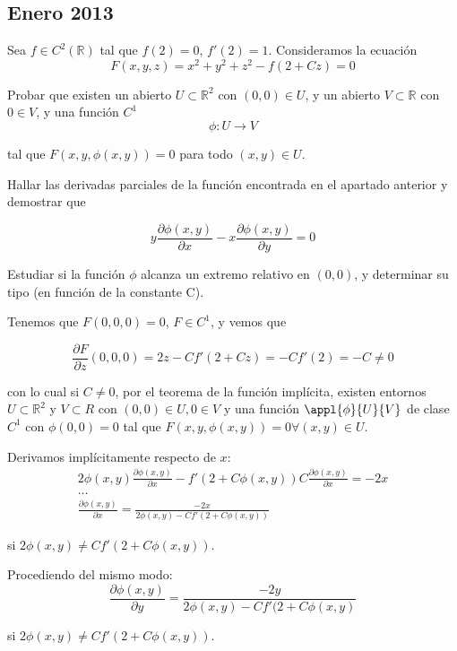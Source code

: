 \subsection{Enero 2013}
\begin{problem}[1]

Sea $f\in C^2(\mathbb{R})$ tal que $f(2) = 0$, $f'(2)=1$. Consideramos la ecuación \[ F(x,y,z) = x^2+y^2+z^2-f(2+Cz)=0 \]

\ppart Probar que existen un abierto $U\subset \mathbb{R}^2$ con $(0,0)\in U$, y un abierto $V\subset \mathbb{R}$ con $0\in V$, y una función $C^1$ \[ \phi: U \rightarrow V \]

tal que $F(x, y, \phi (x, y)) = 0$ para todo $(x,y) \in U$.

\ppart Hallar las derivadas parciales de la función encontrada en el apartado anterior y demostrar que

\[ y\frac{\partial  \phi (x,y)}{\partial  x} - x\frac{\partial  \phi (x,y)}{\partial  y} = 0 \]

\ppart Estudiar si la función $\phi$ alcanza un extremo relativo en $(0,0)$, y determinar su tipo (en función de la constante C).

\solution

\spart Tenemos que $F(0,0,0) = 0$, $F∈C^1$, y vemos que

\[ \frac{\partial  F}{\partial  z}(0,0,0) = 2z - Cf'(2+Cz)=-Cf'(2) = -C \neq 0 \]

con lo cual si $C \neq 0$, por el teorema de la función implícita, existen entornos $U\subset \mathbb{R}^2$ y $V\subset{R}$ con $(0,0)\in U, 0\in V$ y una función $\appl{\phi}{U}{V}$ de clase $C^1$ con $\phi (0,0) = 0$ tal que $F(x,y,\phi (x,y)) = 0 \forall (x,y)\in U$.

\spart
Derivamos implícitamente respecto de $x$:
\begin{gather*}
2\phi (x,y) \frac{\partial  \phi (x,y)}{\partial  x} - f'(2+C\phi (x,y))C\frac{\partial  \phi (x,y)}{\partial  x}=-2x \\
\hdots \\
\frac{\partial  \phi (x,y)}{\partial  x} = \frac{-2x}{2\phi (x,y) - Cf'(2+C\phi (x,y))}
\end{gather*}

 si $2\phi (x,y) \neq Cf'(2+C\phi (x,y))$.

Procediendo del mismo modo:
\[ \frac{\partial  \phi (x,y)}{\partial  y} = \frac{-2y}{2\phi (x,y) - Cf'(2+C\phi (x,y)} \]

si $2\phi (x,y) \neq Cf'(2+C\phi (x,y))$.


\end{problem}
